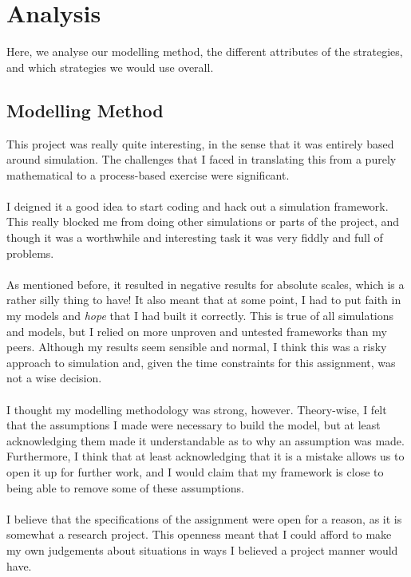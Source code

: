 \section{Analysis} \label{analysis}

Here, we analyse our modelling method, the different attributes of the strategies, and which
strategies we would use overall.

\subsection{Modelling Method}

This project was really quite interesting, in the sense that it was entirely based around
simulation.
The challenges that I faced in translating this from a purely mathematical to a process-based
exercise were significant.\\
\\
I deigned it a good idea to start coding and hack out a simulation framework.
This really blocked me from doing other simulations or parts of the project, and though it was a
worthwhile and interesting task it was very fiddly and full of problems.\\
\\
As mentioned before, it resulted in negative results for absolute scales, which is a rather silly
thing to have!
It also meant that at some point, I had to put faith in my models and {\em hope} that I had built it
correctly.
This is true of all simulations and models, but I relied on more unproven and untested frameworks
than my peers.
Although my results seem sensible and normal, I think this was a risky approach to simulation and,
given the time constraints for this assignment, was not a wise decision.\\
\\
I thought my modelling methodology was strong, however.
Theory-wise, I felt that the assumptions I made were necessary to build the model, but at least
acknowledging them made it understandable as to why an assumption was made.
Furthermore, I think that at least acknowledging that it is a mistake allows us to open it up for
further work, and I would claim that my framework is close to being able to remove some of these
assumptions.\\
\\
I believe that the specifications of the assignment were open for a reason, as it is somewhat a
research project.
This openness meant that I could afford to make my own judgements about situations in ways I
believed a project manner would have.
